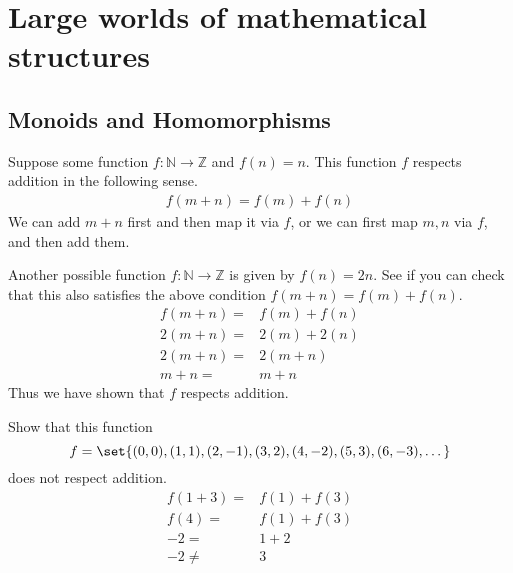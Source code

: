 \section{Large worlds of mathematical structures}
\subsection{Monoids and Homomorphisms}
Suppose some function $f: \mathbb{N} \rightarrow \mathbb{Z}$ and $f(n)=n$. This function
$f$ respects addition in the following sense.
\begin{align*}
    f(m+n) = f(m) + f(n)
\end{align*}
We can add $m+n$ first and then map it via $f$, or we can first map $m, n$ via
$f$, and then add them.

\begin{ttta}
Another possible function $f: \mathbb{N} \rightarrow \mathbb{Z}$ is given by
$f(n) = 2n$. See if you can check that this also satisfies the above condition
$f(m+n) = f(m) + f(n)$.
\begin{align*}
    f(m+n) =& f(m) + f(n)\\
    2(m+n) =& 2(m) + 2(n)\\
    2(m+n) =& 2(m+n)\\
    m+n =& m+n
\end{align*}
Thus we have shown that $f$ respects addition.
\end{ttta}

\begin{ttta}
Show that this function
\[
f=\set{(0, 0), (1, 1), (2, -1), (3, 2), (4, -2), (5, 3), (6, -3), \dots}
\]
does not respect addition.
\begin{align*}
    f(1+3) =& f(1) + f(3)\\
    f(4) =& f(1) + f(3)\\
    -2 =& 1 + 2\\
    -2 \neq& 3
\end{align*}
\end{ttta}


